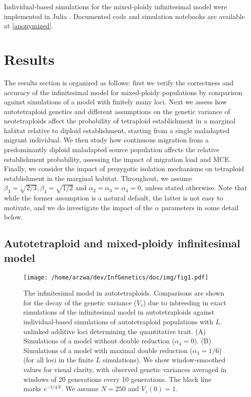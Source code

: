 \documentclass[12pt,a4paper]{article}
\begin{document}
    Individual-based simulations for the mixed-ploidy infinitesimal model were
    implemented in Julia \citep{julia}.
    Documented code and simulation notebooks are available at \url{[anonymized]}.


\section*{Results}

The results section is organized as follows: first we verify the correctness
and accuracy of the infinitesimal model for mixed-ploidy populations by
comparison against simulations of a model with finitely many loci.
Next we assess how autotetraploid genetics and different assumptions on the
genetic variance of neotetraploids affect the probability of tetraploid
establishment in a marginal habitat relative to diploid establishment, starting
from a single maladapted migrant individual.
We then study how continuous migration from a predominantly diploid maladapted
source population affects the relative establishment probability, assessing the
impact of migration load and MCE.
Finally, we consider the impact of prezygotic isolation mechanisms on
tetraploid establishment in the marginal habitat.
Throughout, we assume $\beta_3 = \sqrt{2/3}, \beta_4=\sqrt{1/2}$
and $\alpha_2 = \alpha_3 = \alpha_4 = 0$, unless stated otherwise.
Note that while the former assumption is a natural default, the latter is not
easy to motivate, and we do investigate the impact of the $\alpha$ parameters
in some detail below.

\subsection*{Autotetraploid and mixed-ploidy infinitesimal model}

\begin{figure}[t]
\centering
\texttt{[image: /home/arzwa/dev/InfGenetics/doc/img/fig1.pdf]}
\caption{
The infinitesimal model in autotetraploids.
Comparisons are shown for the decay of the genetic variance ($V_z$) due to
inbreeding in exact simulations of the infinitesimal model in autotetraploids
against individual-based simulations of autotetraploid populations with $L$.
unlinked additive loci determining the quantitative trait. 
(A) Simulations of a model without double reduction ($\alpha_4=0$).
(B) Simulations of a model with maximal double reduction ($\alpha_4=1/6$) (for
all loci in the finite $L$ simulations).
We show window-smoothed values for visual clarity, with observed genetic
variances averaged in windows of 20 generations every 10 generations.
The black line marks $e^{-t/4N}$. 
We assume $N=250$ and $V_z(0) = 1$.
\label{fig:vztet}}
\end{figure}
\end{document}
